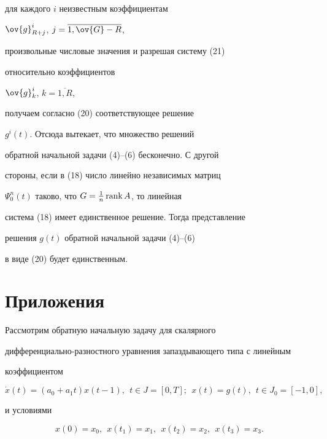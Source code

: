 \begin{pf}
для каждого $i$ неизвестным коэффициентам


$\ov{g}_{R+j}^i$, $j=\overline{1,\ov{G}-R}$,


произвольные числовые значения и разрешая систему (21)


относительно коэффициентов


$\ov{g}_k^i$, $k=\overline{1,R}$, 


получаем согласно (20) соответствующее решение


$g^i(t)$. Отсюда вытекает, что множество решений


обратной начальной задачи (4)--(6) бесконечно. С другой


стороны, если в (18) число линейно независимых матриц


$\Psi_0^n(t)$ таково, что $ G=\frac{1}{n}\operatorname{rank} A$, то линейная


система (18) имеет единственное решение. Тогда представление


решения $g(t)$ обратной начальной задачи (4)--(6)


в виде (20) будет единственным.


\end{pf}








\section{Приложения}





Рассмотрим обратную начальную задачу для скалярного


дифференциально-разностного уравнения запаздывающего типа с линейным


коэффициентом


\begin{equation}


\Dot{x}(t)=(a_0+a_1t)x(t-1), \ \ t\in J=[0,T];\ \


x(t)=g(t), \ \ t\in J_0=[-1,0],


\end{equation}


и условиями


\begin{equation}


x(0)=x_0,\ \ x(t_1)=x_1,\ \ x(t_2)=x_2,\ \ x(t_3)=x_3.


\end{equation}


